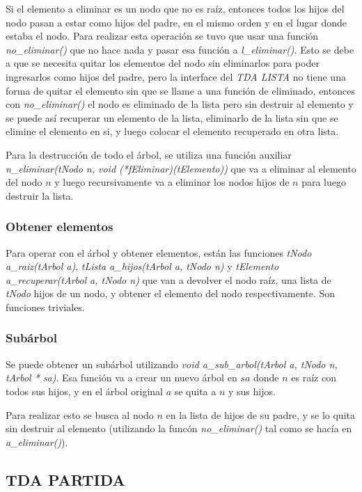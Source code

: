\documentclass[12pt,a4paper]{article}
\begin{document}
Si el elemento a eliminar es un nodo que no es ra\'iz, entonces todos los hijos del nodo pasan a estar como hijos del padre, en el mismo orden y en el lugar donde estaba el nodo. Para realizar esta operaci\'on se tuvo que usar una funci\'on \emph{no\_eliminar()} que no hace nada y pasar esa funci\'on a \emph{l\_eliminar()}. Esto se debe a que se necesita quitar los elementos del nodo sin eliminarlos para poder ingresarlos como hijos del padre, pero la interface del \emph{TDA LISTA} no tiene una forma de quitar el elemento sin que se llame a una funci\'on de eliminado, entonces con \emph{no\_eliminar()} el nodo es eliminado de la lista pero sin destruir al elemento y se puede as\'i recuperar un elemento de la lista, eliminarlo de la lista sin que se elimine el elemento en si, y luego colocar el elemento recuperado en otra lista.

Para la destrucci\'on de todo el \'arbol, se utiliza una funci\'on auxiliar \emph{n\_eliminar(tNodo n, void (*fEliminar)(tElemento))} que va a eliminar al elemento del nodo $n$ y luego recursivamente va a eliminar los nodos hijos de $n$ para luego destruir la lista.

\subsubsection{Obtener elementos}
Para operar con el \'arbol y obtener elementos, est\'an las funciones \emph{tNodo a\_raiz(tArbol a)}, \emph{tLista a\_hijos(tArbol a, tNodo n)} y \emph{tElemento a\_recuperar(tArbol a, tNodo n)} que van a devolver el nodo ra\'iz, una lista de \emph{tNodo} hijos de un nodo, y obtener el elemento del nodo respectivamente. Son funciones triviales.

\subsubsection{Sub\'arbol}
Se puede obtener un sub\'arbol utilizando \emph{void a\_sub\_arbol(tArbol a, tNodo n, tArbol * sa)}. Esa funci\'on va a crear un nuevo \'arbol en $sa$ donde $n$ es ra\'iz con todos sus hijos, y en el \'arbol original $a$ se quita a $n$ y sus hijos.

Para realizar esto se busca al nodo $n$ en la lista de hijos de su padre, y se lo quita sin destruir al elemento (utilizando la func\'on \emph{no\_eliminar()} tal como se hac\'ia en \emph{a\_eliminar()}).

\subsection{TDA PARTIDA}
\end{document}
